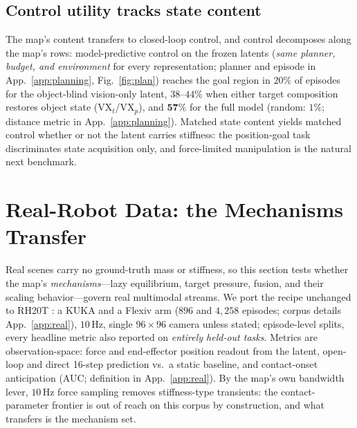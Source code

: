 \documentclass{article} %
\begin{document}
\subsection{Control utility tracks state content}
\label{sec:planning}

The map's content transfers to closed-loop control, and control decomposes
along the map's rows: model-predictive control on the frozen latents
(\emph{same planner, budget, and environment} for every representation;
planner and episode in App.~\ref{app:planning}, Fig.~\ref{fig:plan}) reaches
the goal region in $20\%$ of episodes for the object-blind vision-only
latent, $38$--$44\%$ when either target composition restores object state
(VX$_t$/VX$_p$), and $\mathbf{57\%}$ for the full model (random: $1\%$;
distance metric in App.~\ref{app:planning}). Matched state content
yields matched control whether or not the
latent carries stiffness: the position-goal task discriminates state
acquisition only, and force-limited manipulation is the natural next
benchmark.

\section{Real-Robot Data: the Mechanisms Transfer}
\label{sec:real}

Real scenes carry no ground-truth mass or stiffness, so this section tests
whether the map's \emph{mechanisms}---lazy equilibrium, target pressure,
fusion, and their scaling behavior---govern real multimodal streams. We port
the recipe unchanged to RH20T \citep{fang2023rh20t}: a KUKA and a Flexiv
arm ($896$ and $4{,}258$ episodes; corpus details App.~\ref{app:real}),
$10$\,Hz, single $96{\times}96$ camera unless stated; episode-level
splits, every headline metric also reported on \emph{entirely held-out
tasks}. Metrics are observation-space:
force and end-effector position readout from the latent, open-loop and
direct 16-step prediction vs.\ a static baseline, and contact-onset
anticipation (AUC; definition in App.~\ref{app:real}). By the map's own
bandwidth lever, $10$\,Hz force sampling removes stiffness-type transients:
the contact-parameter frontier is out of reach on this corpus by
construction, and what transfers is the mechanism set.
\end{document}

